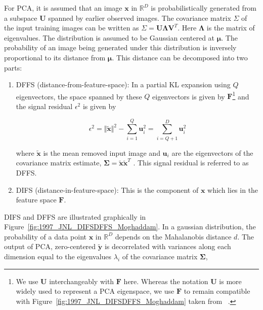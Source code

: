\begin{Body}
For PCA, it is assumed that an image $\mathbf{x}$ in $\mathbb{R}^D$ is probabilistically generated from a subspace $\mathbf{U}$ spanned by earlier observed images.  The covariance matrix $\Sigma$ of the input training images can be written as $\Sigma = \mathbf{U}\mathbf{\Lambda} \mathbf{V}^T$.  Here $\mathbf{\Lambda}$ is the matrix of eigenvalues.  The distribution is assumed to be Gaussian centered at $\boldsymbol{\mu}$.  The probability of an image being generated under this distribution is inversely proportional to its distance from $\boldsymbol{\mu}$.  This distance can be decomposed into two parts:

\begin{enumerate}
\item DFFS (distance-from-feature-space):  In a partial KL expansion using $Q$ eigenvectors, the space spanned by these $Q$ eigenvectors is given by $\mathbf{F}$\footnote{We use $\mathbf{U}$ interchangeably with $\mathbf{F}$ here.  Whereas the notation $\mathbf{U}$ is more widely used to represent a PCA eigenspace, we use $\mathbf{F}$ to remain compatible with Figure~\ref{fig:1997_JNL_DIFSDFFS_Moghaddam} taken from ~\cite{1997_JNL_EigenTRK_Moghaddam}.} and the signal residual $\epsilon^2$ is given by

\begin{equation}
\epsilon^2 = \Vert \tilde{\mathbf{x}} \Vert^2 - \sum\limits_{i=1}^Q \mathbf{u}_i^2 = \sum\limits_{i=Q+1}^D \mathbf{u}_i^2
\end{equation}

where $\tilde{\mathbf{x}}$ is the mean removed input image and $\mathbf{u}_i$ are the eigenvectors of the covariance matrix estimate, $\boldsymbol\Sigma=\tilde{\mathbf{x}}\tilde{\mathbf{x}}^T$  .  This signal residual is referred to as DFFS.
\item DIFS (distance-in-feature-space):  This is the component of $\mathbf{x}$ which lies in the feature space $\mathbf{F}$.  
\end{enumerate}

DIFS and DFFS are illustrated graphically in Figure~\ref{fig:1997_JNL_DIFSDFFS_Moghaddam}.  In a gaussian distribution, the probability of a data point $\mathbf{x}$ in $\mathbb{R}^D$ depends on the Mahalanobis distance $d$.  The output of PCA, zero-centered $\mathbf{\tilde{y}}$ is decorrelated with variances along each dimension equal to the eigenvalues $\lambda_i$ of the covariance matrix $\boldsymbol\Sigma$,



\end{Body}
